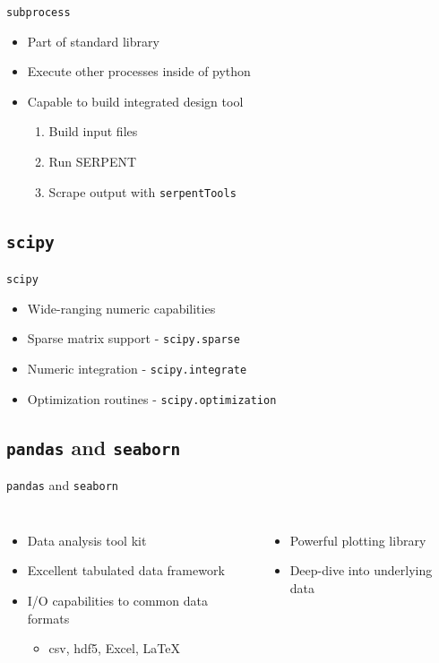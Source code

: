 \documentclass{beamer}
\newcommand{\st}{\texttt{serpentTools} }
\begin{document}
\begin{frame}{\texttt{subprocess}}
    \begin{itemize}
        \item{Part of standard library}
        \item{Execute other processes inside of python}
        \item{Capable to build integrated design tool}
        \begin{enumerate}
            \item{Build input files}
            \item{Run SERPENT}
            \item{Scrape output with \st}
        \end{enumerate}
    \end{itemize}
\end{frame}

\subsection{\texttt{scipy}}

\begin{frame}{\texttt{scipy}}
    \begin{itemize}
        \item{Wide-ranging numeric capabilities}
        \item{Sparse matrix support - \texttt{scipy.sparse}}
        \item{Numeric integration - \texttt{scipy.integrate}}
        \item{Optimization routines - \texttt{scipy.optimization}}
    \end{itemize}
\end{frame}

\subsection{\texttt{pandas} and \texttt{seaborn}}

\begin{frame}{\texttt{pandas} and \texttt{seaborn}}
    \begin{columns}[t]
        \begin{itemize}
            \item{Data analysis tool kit}
            \item{Excellent tabulated data framework}
            \item{I/O capabilities to common data formats}
            \begin{itemize}
                \item{csv, hdf5, Excel, \LaTeX}
            \end{itemize}
        \end{itemize}
        \begin{itemize}
            \item{Powerful plotting library}
            \item{Deep-dive into underlying data}
        \end{itemize}
    \end{columns}
\end{frame}
\end{document}
